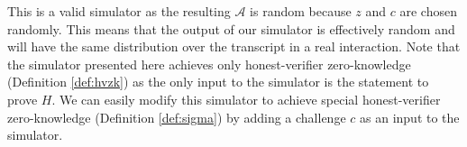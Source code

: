 This is a valid simulator as the resulting $\mathcal A$ is random because $z$ and $c$ are chosen randomly. This means that the output of our simulator is effectively random and will have the same distribution over the transcript in a real interaction.
Note that the simulator presented here achieves only honest-verifier zero-knowledge (Definition
\ref{def:hvzk}) as the only input to the simulator is the statement to prove $H$. We can 
easily modify this simulator to achieve special honest-verifier zero-knowledge (Definition 
\ref{def:sigma}) by adding a challenge $c$ as an input to the simulator.

